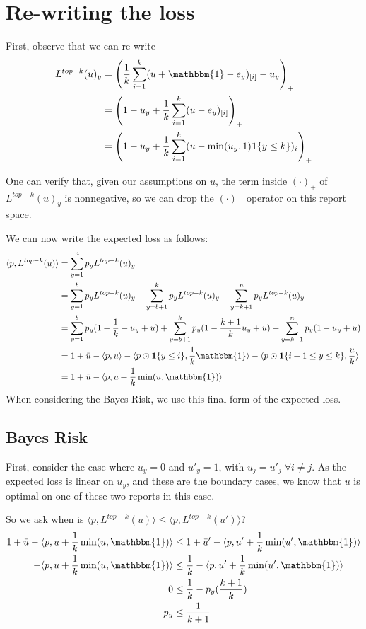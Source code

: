 \documentclass[12pt]{article}
\newcommand{\ubar}{\bar{u}}
\newcommand{\inprod}[2]{\langle #1, #2 \rangle}%
\newcommand{\ones}{\mathbbm{1}}
\newcommand{\Ind}[1]{\mathbf{1}\{#1\}}
\begin{document}
\section{Re-writing the loss}

First, observe that we can re-write
\begin{align*} 
L^{top-k}(u)_y&=\left(\frac{1}{k} \sum_{i=1}^k (u + \ones - e_y)_{[i]} - u_y \right)_+\\ 
&=\left(1 - u_y + \frac{1}{k} \sum_{i=1}^k (u - e_y)_{[i]} \right)_+\\
&=\left(1 - u_y + \frac{1}{k} \sum_{i=1}^k (u - \min(u_y, 1)\Ind{y \leq k})_{i} \right)_+
\end{align*}

One can verify that, given our assumptions on $u$, the term inside $(\cdot)_+$ of $L^{top-k}(u)_y$ is nonnegative, so we can drop the $(\cdot)_+$ operator on this report space.

We can now write the expected loss as follows:
\begin{align*}
\inprod{p}{L^{top-k}(u)} &= \sum_{y=1}^n p_y L^{top-k}(u)_y \\
&= \sum_{y=1}^b p_y L^{top-k}(u)_y + \sum_{y=b+1}^k p_y L^{top-k}(u)_y + \sum_{y=k+1}^n p_y L^{top-k}(u)_y\\
&= \sum_{y=1}^b p_y (1 - \frac 1 k - u_y + \ubar) + \sum_{y=b+1}^k p_y (1 - \frac{k+1} k u_y + \ubar) + \sum_{y=k+1}^n p_y(1-u_y + \ubar)\\
&= 1 + \ubar - \inprod{p}{u} - \inprod{p \odot \Ind{y \leq i}}{\frac 1 k \ones} - \inprod{p \odot \Ind{i+1 \leq y \leq k}}{ \frac u k}\\
&= 1 + \ubar - \inprod{p}{u + \frac 1 k \min(u, \ones)}
\end{align*}
When considering the Bayes Risk, we use this final form of the expected loss.

\subsection{Bayes Risk}
First, consider the case where $u_y = 0$ and $u'_y = 1$, with $u_j = u'_j \;\forall i \neq j$.
As the expected loss is linear on $u_y$, and these are the boundary cases, we know that $u$ is optimal on one of these two reports in this case.

So we ask when is $\inprod{p}{L^{top-k}(u)} \leq \inprod{p}{L^{top-k}(u')}$?
\begin{align*}
1 + \ubar - \inprod{p}{u + \frac 1 k \min(u, \ones)} &\leq 1 + \ubar' - \inprod{p}{u' + \frac 1 k \min(u', \ones)}\\
- \inprod{p}{u + \frac 1 k \min(u, \ones)} &\leq \frac {1}{k} - \inprod{p}{u' + \frac 1 k \min(u', \ones)}\\
0 &\leq \frac{1}{k} - p_y(\frac{k+1}{k})\\
p_y &\leq \frac{1}{k+1}
\end{align*}
\end{document}
